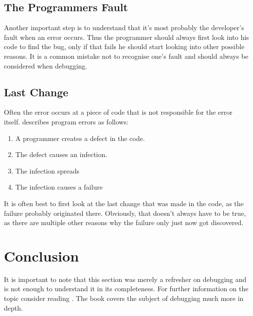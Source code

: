 \subsection{The Programmers Fault}
Another important step is to understand that it's most probably the developer's fault when an error occurs. Thus the programmer should always first look into his code to find the bug, only if that fails he should start looking into other possible reasons. It is a common mistake not to recognise one's fault and should always be considered when debugging.

\subsection{Last Change}
Often the error occurs at a piece of code that is not responsible for the error itself. \cite{Zeller:2009:WPF:1718010} describes program errors as follows:
\begin{enumerate}
  \item A programmer creates a defect in the code.
  \item The defect causes an infection.
  \item The infection spreads
  \item The infection causes a failure
\end{enumerate}

It is often best to first look at the last change that was made in the code, as the failure probably originated there. Obviously, that doesn't always have to be true, as there are multiple other reasons why the failure only just now got discovered.

\section{Conclusion}
It is important to note that this section was merely a refresher on debugging and is not enough to understand it in its completeness. For further information on the topic consider reading \cite{Zeller:2009:WPF:1718010}. The book covers the subject of debugging much more in depth.
